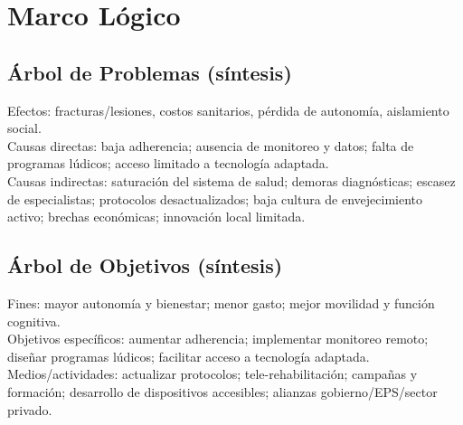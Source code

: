 \section{Marco Lógico}
\subsection{Árbol de Problemas (síntesis)}
Efectos: fracturas/lesiones, costos sanitarios, pérdida de autonomía, aislamiento social.\\
Causas directas: baja adherencia; ausencia de monitoreo y datos; falta de programas lúdicos; acceso limitado a tecnología adaptada.\\
Causas indirectas: saturación del sistema de salud; demoras diagnósticas; escasez de especialistas; protocolos desactualizados; baja cultura de envejecimiento activo; brechas económicas; innovación local limitada.

\subsection{Árbol de Objetivos (síntesis)}
Fines: mayor autonomía y bienestar; menor gasto; mejor movilidad y función cognitiva.\\
Objetivos específicos: aumentar adherencia; implementar monitoreo remoto; diseñar programas lúdicos; facilitar acceso a tecnología adaptada.\\
Medios/actividades: actualizar protocolos; tele-rehabilitación; campañas y formación; desarrollo de dispositivos accesibles; alianzas gobierno/EPS/sector privado.

